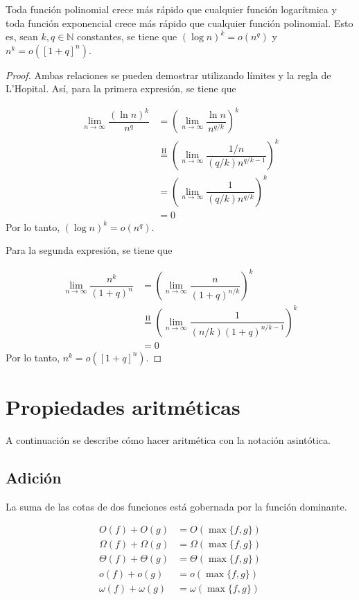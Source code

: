 \begin{thm}
    Toda función polinomial crece más rápido que cualquier función logarítmica y
    toda función exponencial crece más rápido que cualquier función polinomial.
    Esto es, sean $k,q\in\mathbb{N}$ constantes, se tiene que $(\log n)^k=o(n^q)$
    y $n^k=o([1+q]^n)$.
\end{thm}

\begin{proof}
    Ambas relaciones se pueden demostrar utilizando límites y la regla
    de L'Hopital. Así, para la primera expresión, se tiene que
    
    \begin{align*}
        \lim_{n\to\infty}\dfrac{(\ln n)^{k}}{n^{q}} &= \left(\lim_{n\to\infty}\dfrac{\ln n}{n^{q/k}}\right)^{k}\\
        &\overset{\text{H}}{=}\left(\lim_{n\to\infty}\dfrac{1/n}{(q/k)n^{q/k-1}}\right)^{k}\\
        &= \left(\lim_{n\to\infty}\dfrac{1}{(q/k)n^{q/k}}\right)^{k}\\
        &= 0
    \end{align*}
    Por lo tanto, $(\log n)^{k}=o(n^{q})$.
    
    Para la segunda expresión, se tiene que 
    
    \begin{align*}
    \lim_{n\to\infty}\dfrac{n^{k}}{(1+q)^{n}} &= \left(\lim_{n\to\infty}\dfrac{n}{(1+q)^{n/k}}\right)^{k}\\
    &\overset{\text{H}}{=}\left(\lim_{n\to\infty}\dfrac{1}{(n/k)(1+q)^{n/k-1}}\right)^{k}\\
    &= 0
    \end{align*}
    Por lo tanto, $n^{k}=o([1+q]^{n})$.
\end{proof}

\section{Propiedades aritméticas}

A continuación se describe cómo hacer aritmética con la notación asintótica.

\subsection{Adición}

La suma de las cotas de dos funciones está gobernada por la función
dominante.

\[
\begin{aligned}
    O(f)+O(g) &= O(\max\{f,g\})\\
    \Omega(f)+\Omega(g) &= \Omega(\max\{f,g\})\\
    \Theta(f)+\Theta(g) &= \Theta(\max\{f,g\})\\
    o(f)+o(g) &= o(\max\{f,g\})\\
    \omega(f)+\omega(g) &= \omega(\max\{f,g\})
\end{aligned}
\]

